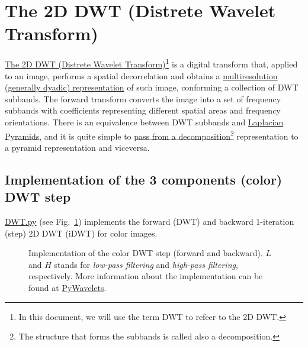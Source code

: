 \section{The 2D DWT (Distrete Wavelet Transform)}
\href{https://vicente-gonzalez-ruiz.github.io/image_transformations_for_coding/#x1-3100020}{The
  2D DWT (Distrete Wavelet Transform)\footnote{In this document, we will use the term DWT to refeer to
    the 2D DWT.}} is a digital
transform that, applied to an image, performs a spatial decorrelation
and obtains a
\href{https://vicente-gonzalez-ruiz.github.io/image_transformations_for_coding/index.html#x1-3500024}{multiresolution
  (generally dyadic) representation} of such image, conforming a
collection of DWT subbands. The forward transform converts the image
into a set of frequency subbands with coefficients representing
different spatial areas and frequency orientations. There is an
equivalence between DWT subbands and
\href{http://fourier.eng.hmc.edu/e161/lectures/canny/node3.html}{Laplacian
  Pyramids}, and it is quite simple to
\href{https://vicente-gonzalez-ruiz.github.io/pyramids-and-wavelets/}{pass
  from a decomposition\footnote{The structure that forms the subbands
    is called also a decomposition.} representation to a pyramid
  representation and viceversa}.

\subsection{Implementation of the 3 components (color) DWT step}
\href{https://github.com/Sistemas-Multimedia/MCOLP/blob/master/src/DWT.py}{DWT.py}
(see Fig.~\ref{fig:DWT}) implements the forward (DWT) and backward
1-iteration (step) 2D DWT (iDWT) for color images.

\begin{figure}
  
  
  \caption{Implementation of the color DWT step (forward and
    backward). $L$ and $H$ stands for \emph{low-pass filtering} and
    \emph{high-pass filtering}, respectively.  More information about the
    implementation can be found at
    \href{https://pywavelets.readthedocs.io/en/latest/index.html}{PyWavelets}.}
  \label{fig:DWT}
\end{figure}

